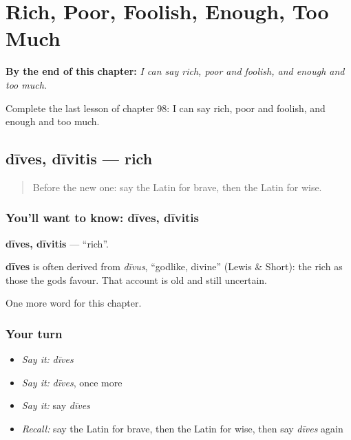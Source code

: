 
\chapter{Rich, Poor, Foolish, Enough, Too Much}
\label{ch:la-rich-poor-foolish-enough-too-much}

\begin{chapteropening}
\textbf{By the end of this chapter:} \emph{I can say rich, poor and foolish, and enough and too much.}

Complete the last lesson of chapter 98: I can say rich, poor and foolish, and enough and too much.
\end{chapteropening}

\section[dīves, dīvitis]{dīves, dīvitis — rich}

\label{lesson:LA-C98-dives}



\begin{quote}
Before the new one: say the Latin for brave, then the Latin for wise.
\end{quote}

\subsection*{You'll want to know: dīves, dīvitis}
\textbf{dīves, dīvitis} — \textquotedblleft{}rich\textquotedblright{}.

\begin{cousinweb}
\textbf{dīves} is often derived from \emph{dīvus}, \textquotedblleft{}godlike, divine\textquotedblright{} (Lewis \& Short): the rich as those the gods favour. That account is old and still uncertain.
\end{cousinweb}

\begin{grammarlens}[title={What you've built}]
One more word for this chapter.
\end{grammarlens}

\subsection*{Your turn}
\begin{itemize}
\raggedright
  \item \emph{Say it:} \emph{dīves}
  \item \emph{Say it:} \emph{dīves}, once more
  \item \emph{Say it:} say \emph{dīves}
  \item \emph{Recall:} say the Latin for brave, then the Latin for wise, then say \emph{dīves} again
\end{itemize}

